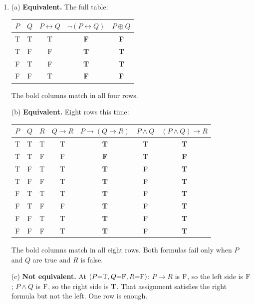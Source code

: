 \begin{enumerate}[label=\textbf{\arabic*.},leftmargin=1.8em,itemsep=0.45em]
  (c) \textbf{Contingency}: $(P{=}\logF,Q{=}\logT)$ satisfies it and $(P{=}\logT,Q{=}\logF)$ doesn't. (d) \textbf{Tautology}: every row is $\logT$.

  (e) \textbf{Contingency}, and two assignments are all you need. $(P{=}\logF,Q{=}\logT,R{=}\logF)$: the premise $P\lor Q$ is $\logT$ and the conclusion $P\lor R$ is $\logF$, so it isn't satisfied. $(P{=}\logT,Q{=}\logT,R{=}\logT)$: both sides are $\logT$, so it is.
  \item (a) \textbf{Equivalent.} The full table:

  \smallskip\begin{tabular}{cc|c>{\bfseries}c>{\bfseries}c}
  \toprule
  $P$ & $Q$ & $P\leftrightarrow Q$ & $\lnot(P\leftrightarrow Q)$ & $P\oplus Q$\\
  \midrule
  T & T & T & F & F\\
  T & F & F & T & T\\
  F & T & F & T & T\\
  F & F & T & F & F\\
  \bottomrule
  \end{tabular}\par\smallskip

  The bold columns match in all four rows.

  (b) \textbf{Equivalent.} Eight rows this time:

  \smallskip\begin{tabular}{ccc|c>{\bfseries}c|c>{\bfseries}c}
  \toprule
  $P$ & $Q$ & $R$ & $Q\to R$ & $P\to(Q\to R)$ & $P\land Q$ & $(P\land Q)\to R$\\
  \midrule
  T & T & T & T & T & T & T\\
  T & T & F & F & F & T & F\\
  T & F & T & T & T & F & T\\
  T & F & F & T & T & F & T\\
  F & T & T & T & T & F & T\\
  F & T & F & F & T & F & T\\
  F & F & T & T & T & F & T\\
  F & F & F & T & T & F & T\\
  \bottomrule
  \end{tabular}\par\smallskip

  The bold columns match in all eight rows. Both formulas fail only when $P$ and $Q$ are true and $R$ is false.

  (c) \textbf{Not equivalent.} At $(P{=}\mathrm{T},Q{=}\mathrm{F},R{=}\mathrm{F})$: $P\to R$ is $\logF$, so the left side is $\logF$; $P\land Q$ is $\logF$, so the right side is $\logT$. That assignment satisfies the right formula but not the left. One row is enough.


\end{enumerate}
